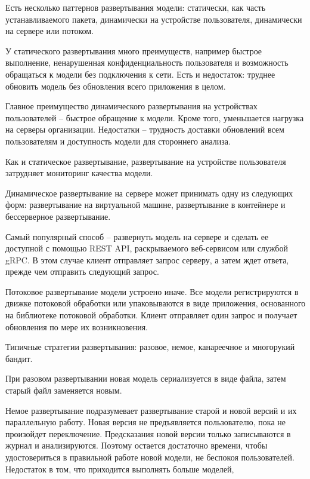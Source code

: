 {	\par \redline Есть несколько паттернов развертывания модели: статически, как часть устанавливаемого пакета, динамически на устройстве пользователя, динамически на сервере или потоком.
	\par \redline У статического развертывания много преимуществ, например быстрое выполнение, ненарушенная конфиденциальность пользователя и возможность
	обращаться к модели без подключения к сети. Есть и недостаток: труднее
	обновить модель без обновления всего приложения в целом.
	\par \redline Главное преимущество динамического развертывания на устройствах
	пользователей – быстрое обращение к модели. Кроме того, уменьшается
	нагрузка на серверы организации. Недостатки – трудность доставки обновлений всем пользователям и доступность модели для стороннего анализа.
	\par \redline Как и статическое развертывание, развертывание на устройстве пользователя затрудняет мониторинг качества модели.
	\par \redline Динамическое развертывание на сервере может принимать одну из следующих форм: развертывание на виртуальной машине, развертывание в контейнере и бессерверное развертывание.
	\par \redline Самый популярный способ – развернуть модель на сервере и сделать ее
	доступной с помощью REST API, раскрываемого веб-сервисом или службой
	gRPC. В этом случае клиент отправляет запрос серверу, а затем ждет ответа,
	прежде чем отправить следующий запрос.
	\par \redline Потоковое развертывание модели устроено иначе. Все модели регистрируются в движке потоковой обработки или упаковываются в виде приложения,
	основанного на библиотеке потоковой обработки. Клиент отправляет один
	запрос и получает обновления по мере их возникновения.
	\par \redline Типичные стратегии развертывания: разовое, немое, канареечное и многорукий бандит.
	\par \redline  При разовом развертывании новая модель сериализуется в виде файла,
	затем старый файл заменяется новым.
	\par \redline  Немое развертывание подразумевает развертывание старой и новой версий и их параллельную работу. Новая версия не предъявляется пользователю,
	пока не произойдет переключение. Предсказания новой версии только записываются в журнал и анализируются. Поэтому остается достаточно времени,
	чтобы удостовериться в правильной работе новой модели, не беспокоя пользователей. Недостаток в том, что приходится выполнять больше моделей,
}
